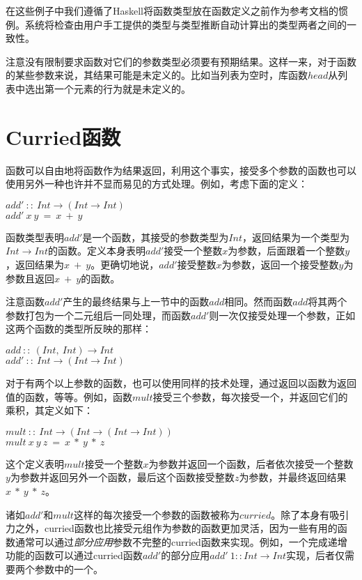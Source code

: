 在这些例子中我们遵循了Haskell将函数类型放在函数定义之前作为参考文档的惯例。系统将检查由用户手工提供的类型与类型推断自动计算出的类型两者之间的一致性。

注意没有限制要求函数对它们的参数类型必须要有预期结果。这样一来，对于函数的某些参数来说，其结果可能是未定义的。比如当列表为空时，库函数$head$从列表中选出第一个元素的行为就是未定义的。

\section{Curried函数}
函数可以自由地将函数作为结果返回，利用这个事实，接受多个参数的函数也可以使用另外一种也许并不显而易见的方式处理。例如，考虑下面的定义：

\noindent\hspace*{1cm} $add'~::~Int \rightarrow (Int \rightarrow Int)$\\
\hspace*{1cm} $add'~x~y~=~x~+~y$

函数类型表明$add'$是一个函数，其接受的参数类型为$Int$，返回结果为一个类型为$Int \rightarrow Int$的函数。定义本身表明$add'$接受一个整数$x$为参数，后面跟着一个整数$y$，返回结果为$x~+ ~y$。更确切地说，$add'$接受整数$x$为参数，返回一个接受整数$y$为参数且返回$x~+~y$的函数。

注意函数$add'$产生的最终结果与上一节中的函数$add$相同。然而函数$add$将其两个参数打包为一个二元组后一同处理，而函数$add'$则一次仅接受处理一个参数，正如这两个函数的类型所反映的那样：

\noindent\hspace*{1cm} $add~::~(Int,~Int) \rightarrow Int$\\
\hspace*{1cm} $add'~::~Int \rightarrow (Int \rightarrow Int)$

对于有两个以上参数的函数，也可以使用同样的技术处理，通过返回以函数为返回值的函数，等等。例如，函数$mult$接受三个参数，每次接受一个，并返回它们的乘积，其定义如下：

\noindent\hspace*{1cm} $mult~::~Int \rightarrow (Int \rightarrow (Int \rightarrow Int))$\\
\hspace*{1cm} $mult~x~y~z~=~x~*~y~*~z$

这个定义表明$mult$接受一个整数$x$为参数并返回一个函数，后者依次接受一个整数$y$为参数并返回另外一个函数，最后这个函数接受整数$z$为参数，并最终返回结果$x~*~y~*~z$。

诸如$add'$和$mult$这样的每次接受一个参数的函数被称为$curried$。除了本身有吸引力之外，curried函数也比接受元组作为参数的函数更加灵活，因为一些有用的函数通常可以通过\textit{部分应用}参数不完整的curried函数来实现。例如，一个完成递增功能的函数可以通过curried函数$add'$的部分应用$add'~1 :: Int \rightarrow Int$实现，后者仅需要两个参数中的一个。

